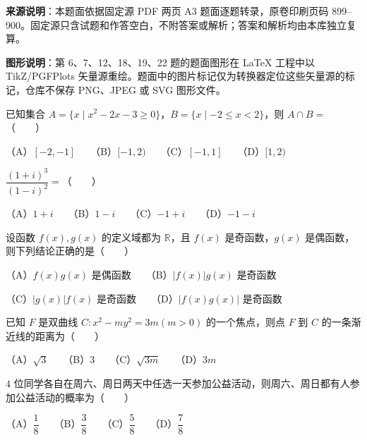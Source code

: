 


\begin{gktip}
\textbf{来源说明}：本题面依据固定源 PDF 两页 A3 题面逐题转录，原卷印刷页码 899–900。固定源只含试题和作答空白，不附答案或解析；答案和解析均由本库独立复算。

\textbf{图形说明}：第 6、7、12、18、19、22 题的题面图形在 LaTeX 工程中以 TikZ/PGFPlots 矢量源重绘。题面中的图片标记仅为转换器定位这些矢量源的标记，仓库不保存 PNG、JPEG 或 SVG 图形文件。
\end{gktip}


\begin{question}
已知集合 $A=\{x\mid x^2-2x-3\geqslant0\}$，$B=\{x\mid-2\leqslant x<2\}$，则 $A\cap B=$\mbox{（　　）}

（A）$[-2,-1]$　　（B）$[-1,2)$　　（C）$[-1,1]$　　（D）$[1,2)$

\end{question}
\begin{question}
$\dfrac{(1+i)^3}{(1-i)^2}=$\mbox{（　　）}

（A）$1+i$　　（B）$1-i$　　（C）$-1+i$　　（D）$-1-i$

\end{question}
\begin{question}
设函数 $f(x),g(x)$ 的定义域都为 $\mathbb R$，且 $f(x)$ 是奇函数，$g(x)$ 是偶函数，则下列结论正确的是\mbox{（　　）}

（A）$f(x)g(x)$ 是偶函数　　（B）$|f(x)|g(x)$ 是奇函数

（C）$|g(x)|f(x)$ 是奇函数　　（D）$|f(x)g(x)|$ 是奇函数

\end{question}
\begin{question}
已知 $F$ 是双曲线 $C:x^2-my^2=3m (m>0)$ 的一个焦点，则点 $F$ 到 $C$ 的一条渐近线的距离为\mbox{（　　）}

（A）$\sqrt3$　　（B）$3$　　（C）$\sqrt{3m}$　　（D）$3m$

\end{question}
\begin{question}
$4$ 位同学各自在周六、周日两天中任选一天参加公益活动，则周六、周日都有人参加公益活动的概率为\mbox{（　　）}

（A）$\dfrac18$　　（B）$\dfrac38$　　（C）$\dfrac58$　　（D）$\dfrac78$

\Needspace{0.4\textheight}
\end{question}
